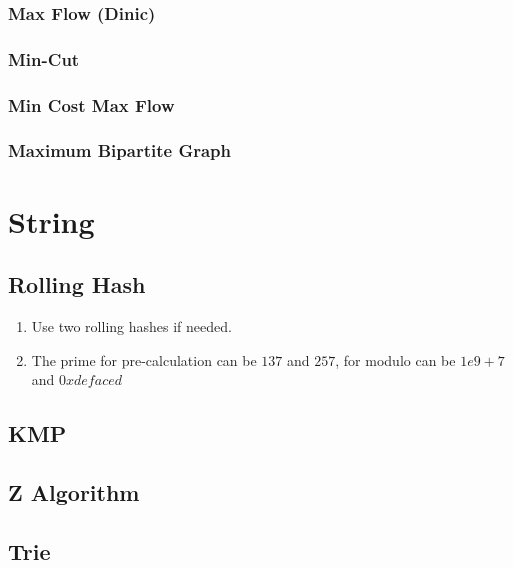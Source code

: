 \documentclass[10pt,oneside]{article}
\begin{document}
\begin{landscape}
\begin{multicols}{2}
\subsubsection{Max Flow (Dinic)}

\subsubsection{Min-Cut}

\subsubsection{Min Cost Max Flow}

\subsubsection{Maximum Bipartite Graph}


\section{String}

\subsection{Rolling Hash}

\begin{enumerate}
	\item Use two rolling hashes if needed.  
	\item The prime for pre-calculation can be $137$ and $257$, for modulo can be $1e9 + 7$ and $0xdefaced$ 
\end{enumerate}



\subsection{KMP}



\subsection{Z Algorithm}

\subsection{Trie}


\end{multicols}
\end{landscape}
\end{document}
